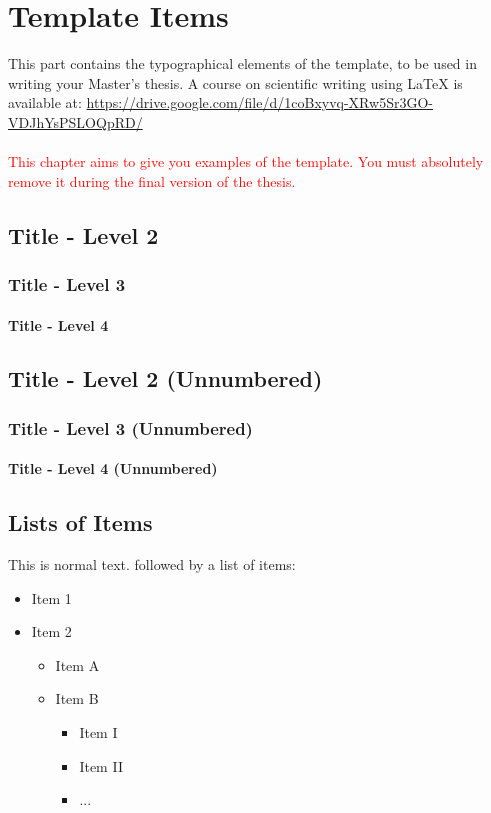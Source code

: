\chapter{Template Items} \label{chap:template}

This part contains the typographical elements of the template, to be used in writing your Master's thesis. A course on scientific writing using \LaTeX{} is available at:
\url{https://drive.google.com/file/d/1coBxyvq-XRw5Sr3GO-VDJhYsPSLOQpRD/}
\\
\\
\textcolor{red}{
	This chapter aims to give you examples of the template. You must absolutely remove it during the final version of the thesis.
}

\section{Title - Level 2} \label{sec:example}
\subsection{Title - Level 3}
\subsubsection{Title - Level 4}

\section*{Title - Level 2 (Unnumbered)}
\subsection*{Title - Level 3 (Unnumbered)}
\subsubsection*{Title - Level 4 (Unnumbered)}

\section{Lists of Items}
This is normal text. followed by a list of items:

\firmlist
\begin{itemize}
	\item Item 1	
	\item Item 2
	\begin{itemize}
		\item Item A
		\item Item B
		\begin{itemize}
			\item Item I
			\item Item II
			\item ...
		\end{itemize}
	\end{itemize}
\end{itemize}

